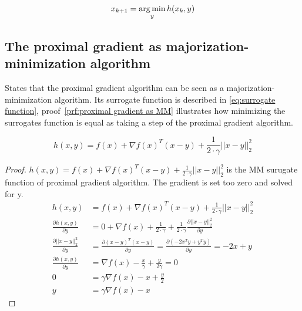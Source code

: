 	\begin{equation}
		x_{k+1} = \operatorname*{arg\,min}_y h(x_k,y)
		\label{eq:MM algorithm formula step}
	\end{equation}

	\subsection{The proximal gradient as majorization-minimization algorithm}
	\cite{NealParikh} States that the proximal gradient algorithm can be seen as a majorization-minimization algorithm. Its surrogate function is described in \eqref{eq:surrogate function}, proof~\ref{prf:proximal gradient as MM} illustrates how minimizing the surrogates function is equal as taking a step of the proximal gradient algorithm.
	
	\begin{equation}
		h(x,y) = f(x) + \nabla f(x)^T(x-y) + \frac{1}{2 \cdot \gamma}||x-y||^2_2
		\label{eq:surrogate function}
	\end{equation}
	
	\begin{proof}
		$h(x,y) = f(x) + \nabla f(x)^T(x-y) + \frac{1}{2 \cdot \gamma}||x-y||^2_2$ is the MM surugate function of proximal gradient algorithm. The gradient is set too zero and solved for y.
		\begin{align*}
		h(x,y)
		& = f(x) + \nabla f(x)^T(x-y) + \frac{1}{2 \cdot \gamma}||x-y||^2_2 \\
		\frac{\partial h(x,y)}{\partial y}
		& = 0 + \nabla f(x) + \frac{1}{2 \cdot \gamma} + \frac{1}{2 \cdot \gamma}\frac{\partial ||x-y||^2_2}{\partial y}  \\	
		\frac{\partial ||x-y||^2_2}{\partial y}
		& = \frac{\partial(x-y)^T(x-y)}{\partial y} = \frac{\partial(-2x^Ty + y^Ty)}{\partial y} = -2x+y \\
		\frac{\partial h(x,y)}{\partial y}
		& = \nabla f(x) - \frac{x}{\gamma} + \frac{y}{2 \gamma} = 0 \\
		0
		& = \gamma \nabla f(x) - x + \frac{y}{2} \\
		y & = \gamma \nabla f(x) - x
		\end{align*}
		\label{prf:proximal gradient as MM}
	\end{proof}